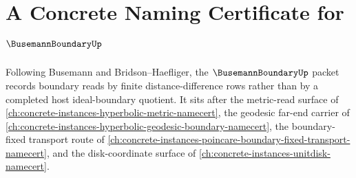 \chapter{A Concrete Naming Certificate for $\BusemannBoundaryUp$}
\label{ch:concrete-instances-busemann-boundary-namecert}

Following Busemann and Bridson--Haefliger, the $\BusemannBoundaryUp$ packet records boundary reads by finite distance-difference rows rather than by a completed host ideal-boundary quotient. It sits after the metric-read surface of \autoref{ch:concrete-instances-hyperbolic-metric-namecert}, the geodesic far-end carrier of \autoref{ch:concrete-instances-hyperbolic-geodesic-boundary-namecert}, the boundary-fixed transport route of \autoref{ch:concrete-instances-poincare-boundary-fixed-transport-namecert}, and the disk-coordinate surface of \autoref{ch:concrete-instances-unitdisk-namecert}.


